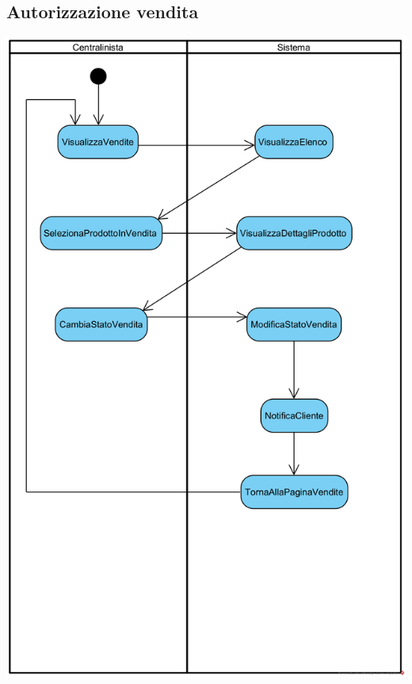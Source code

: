 \documentclass[12pt,a4paper]{article}
\begin{document}
\subsection{Autorizzazione vendita}
\begin{center}
\includegraphics[width=\textwidth]{ActivityDiagram/CentralinistaAutorizzazioneVendita}
\end{center}
\end{document}

